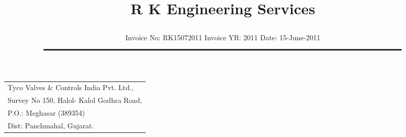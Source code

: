 \documentclass[11pt]{article}
\title{\vspace*{-1.5cm} \centerline{ \Huge \bf \hspace{0cm} R K Engineering Services}\vspace*{-0.75cm}}
\author{%
 \scriptsize Invoice No: RK15072011  \hspace*{4cm}  Invoice YR: 2011 \hspace*{4cm} Date: 15-June-2011\\
$\rule{7.0in}{0.5mm}$}
\date{}
\begin{document}
\maketitle
\thispagestyle{empty}
\vspace*{0.5cm}	
\begin{flushleft}
{\footnotesize
\begin{tabular}{l}
Tyco Valves \& Controls India Pvt. Ltd.,\\
Survey No 150, Halol- Kalol Godhra Road,\\
P.O.:  Meghasar (389354)\\
Dist: Panchmahal, Gujarat.\\
\end{tabular}
}
\end{flushleft}


\vspace*{0.5cm}

\end{document}
